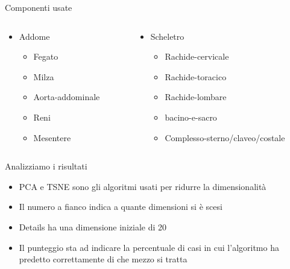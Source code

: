 \documentclass{beamer}
\begin{document}
\begin{frame}{Componenti usate}
	\begin{columns}
		\begin{column}{0.5\textwidth}
			\begin{itemize}
				\item Addome
				\begin{itemize}
					\item Fegato
					\item Milza
					\item Aorta-addominale
					\item Reni
					\item Mesentere
				\end{itemize}
			\end{itemize}
		\end{column}
		\begin{column}{0.5\textwidth}
			\begin{itemize}
				\item Scheletro
				\begin{itemize}
					\item Rachide-cervicale
					\item Rachide-toracico
					\item Rachide-lombare
					\item bacino-e-sacro
					\item Complesso-sterno/claveo/costale
				\end{itemize}
			\end{itemize}
		\end{column}
	\end{columns}
\end{frame}

\begin{frame}{Analizziamo i risultati}
	\begin{itemize}
		\item PCA e TSNE sono gli algoritmi usati per ridurre la dimensionalità
		\item Il numero a fianco indica a quante dimensioni si è scesi
		\item Details ha una dimensione iniziale di 20
		\item Il punteggio sta ad indicare la percentuale di casi in cui l'algoritmo ha predetto correttamente di che mezzo si tratta
	\end{itemize}

\end{frame}
\end{document}
